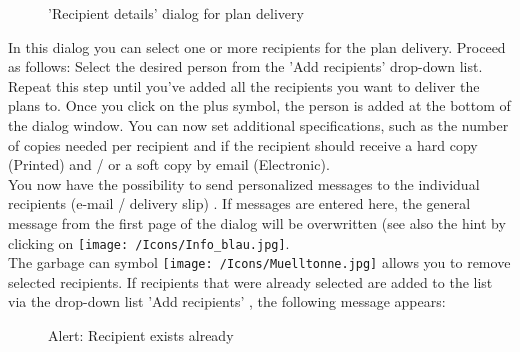 \begin{figure}[H]
\caption{'Recipient details' dialog for plan delivery}
\end{figure}

In this dialog you can select one or more recipients for the plan delivery. Proceed as follows: Select the desired person from the 'Add recipients' drop-down list. Repeat this step until you've added all the recipients you want to deliver the plans to. Once you click on the plus symbol, the person is added at the bottom of the dialog window. You can now set additional specifications, such as the number of copies needed per recipient and if the recipient should receive a hard copy (Printed) and / or a soft copy by email (Electronic). \\
You now have the possibility to send personalized messages to the individual recipients (e-mail / delivery slip) . If messages are entered here, the general message from the first page of the dialog will be overwritten (see also the hint by clicking on \texttt{[image: /Icons/Info\_blau.jpg]}. \\
The garbage can symbol \texttt{[image: /Icons/Muelltonne.jpg]}  allows you to remove selected recipients. If recipients that were already selected are added to the list via the drop-down list 'Add recipients' , the following message appears:

\begin{figure}[H]
\caption{Alert: Recipient exists already}
\end{figure}

